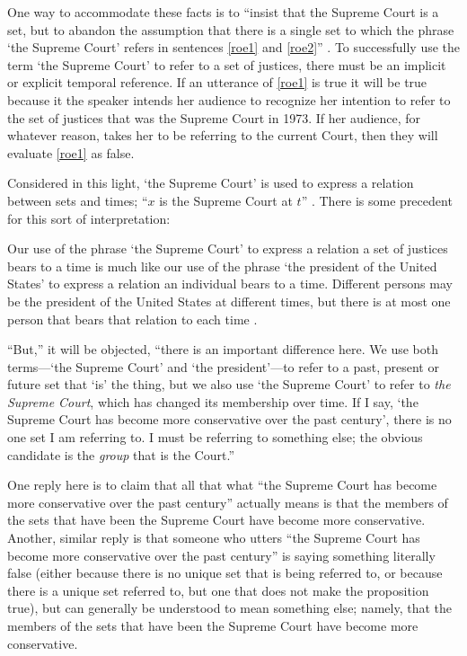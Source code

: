 \documentclass[11pt]{article}
\newenvironment{squote}{%
\begin{spacing}{1}
\begin{list}{}{%
\setlength{\labelwidth}{0pt}%
\rightmargin\leftmargin%
}
\item\relax
}{%
\end{list}%
\end{spacing}
}
\begin{document}
\begin{spacing}{1.5}
One way to accommodate these facts is to ``insist that the Supreme
Court is a set, but to abandon the assumption that there is a single
set to which the phrase `the Supreme Court' refers in sentences
\ref{roe1} and \ref{roe2}'' \citep[138]{uzquiano2004a}.  To
successfully use the term `the Supreme Court' to refer to a set of
justices, there must be an implicit or explicit temporal reference.
If an utterance of \ref{roe1} is true it will be true because it the
speaker intends her audience to recognize her intention to refer to
the set of justices that was the Supreme Court in 1973.  If her
audience, for whatever reason, takes her to be referring to the
current Court, then they will evaluate \ref{roe1} as false.

Considered in this light, `the Supreme Court' is used to express a
relation between sets and times; ``$x$ is the Supreme Court at $t$''
\citep[140]{uzquiano2004a}.  There is some precedent for this sort of
interpretation:

\begin{squote}
Our use of the phrase `the Supreme Court' to express a relation a set
of justices bears to a time is much like our use of the phrase `the
president of the United States' to express a relation an individual
bears to a time.  Different persons may be the president of the United
States at different times, but there is at most one person that bears
that relation to each time \citep[138]{uzquiano2004a}.
\end{squote}

``But,'' it will be objected, ``there is an important difference here.
We use both terms---`the Supreme Court' and `the president'---to refer
to a past, present or future set that `is' the thing, but we also use
`the Supreme Court' to refer to {\em the Supreme Court}, which has
changed its membership over time.  If I say, `the Supreme Court has
become more conservative over the past century', there is no one set I
am referring to.  I must be referring to something else; the obvious
candidate is the {\em group} that is the Court.''

One reply here is to claim that all that what ``the Supreme Court has
become more conservative over the past century'' actually means is
that the members of the sets that have been the Supreme Court have
become more conservative.  Another, similar reply is that someone who
utters ``the Supreme Court has become more conservative over the past
century'' is saying something literally false (either because there is
no unique set that is being referred to, or because there is a unique
set referred to, but one that does not make the proposition true), but
can generally be understood to mean something else; namely, that the
members of the sets that have been the Supreme Court have become more
conservative.


\end{spacing}
\end{document}
